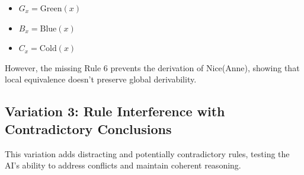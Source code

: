 \documentclass{article} %
\begin{document}
\begin{itemize}
    \item $G_x = \mathrm{Green}(x)$
    \item $B_x = \mathrm{Blue}(x)$
    \item $C_x = \mathrm{Cold}(x)$
\end{itemize}


However, the missing Rule 6 prevents the derivation of Nice(Anne), showing that local equivalence doesn't preserve global derivability.

\subsection{Variation 3: Rule Interference with Contradictory Conclusions}

This variation adds distracting and potentially contradictory rules, testing the AI's ability to address conflicts and maintain coherent reasoning.
\end{document}
